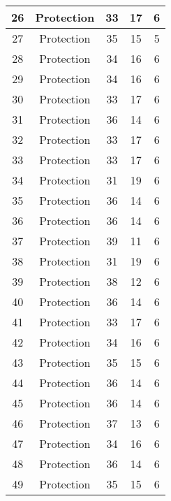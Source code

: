 \documentclass[results.tex]{subfiles}
\begin{document}
\begin{center}
\begin{tabular}{| c || c | c | c | c |}
    \hline
    26 & Protection & 33 & 17 & 6 \\ 
    \hline
    27 & Protection & 35 & 15 & 5 \\ 
    \hline
    28 & Protection & 34 & 16 & 6 \\ 
    \hline
    29 & Protection & 34 & 16 & 6 \\ 
    \hline
    30 & Protection & 33 & 17 & 6 \\ 
    \hline
    31 & Protection & 36 & 14 & 6 \\ 
    \hline
    32 & Protection & 33 & 17 & 6 \\ 
    \hline
    33 & Protection & 33 & 17 & 6 \\ 
    \hline
    34 & Protection & 31 & 19 & 6 \\ 
    \hline
    35 & Protection & 36 & 14 & 6 \\ 
    \hline
    36 & Protection & 36 & 14 & 6 \\ 
    \hline
    37 & Protection & 39 & 11 & 6 \\ 
    \hline
    38 & Protection & 31 & 19 & 6 \\ 
    \hline
    39 & Protection & 38 & 12 & 6 \\ 
    \hline
    40 & Protection & 36 & 14 & 6 \\ 
    \hline
    41 & Protection & 33 & 17 & 6 \\ 
    \hline
    42 & Protection & 34 & 16 & 6 \\ 
    \hline
    43 & Protection & 35 & 15 & 6 \\ 
    \hline
    44 & Protection & 36 & 14 & 6 \\ 
    \hline
    45 & Protection & 36 & 14 & 6 \\ 
    \hline
    46 & Protection & 37 & 13 & 6 \\ 
    \hline
    47 & Protection & 34 & 16 & 6 \\ 
    \hline
    48 & Protection & 36 & 14 & 6 \\ 
    \hline
    49 & Protection & 35 & 15 & 6 \\ 
    \hline   \end{tabular}
\end{center}
\end{document}
